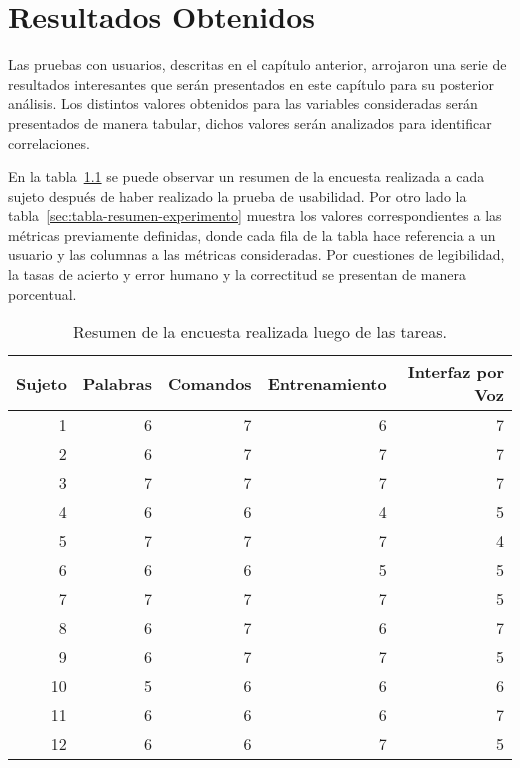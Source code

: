 \chapter{Resultados Obtenidos}
\label{sec:resultados}


Las pruebas con usuarios, descritas en el cap\'itulo anterior, arrojaron una serie de
resultados interesantes que ser\'an presentados en este cap\'itulo para su posterior an\'alisis. Los
distintos valores obtenidos para las variables consideradas ser\'an presentados de manera tabular, dichos
valores ser\'an analizados para identificar correlaciones.

En la tabla~\ref{sec:tabla-encuesta}
se puede observar un resumen de la encuesta realizada a cada sujeto despu\'es de haber realizado la prueba de
usabilidad. 
Por otro lado la tabla~\ref{sec:tabla-resumen-experimento} muestra los valores correspondientes
a las métricas previamente definidas, donde cada fila de la tabla hace referencia a un usuario y 
las columnas a las m\'etricas consideradas. Por cuestiones de legibilidad, la tasas de acierto 
y error humano y la correctitud se presentan de manera porcentual.

\begin{table}[H]
\centering
\footnotesize
\begin{tabular}{|r|r|r|r|r|}
\hline
    Sujeto & Palabras & Comandos & Entrenamiento & Interfaz por Voz \\
\hline
    1 & 6 & 7 & 6 & 7 \\
    2 & 6 & 7 & 7 & 7 \\
    3 & 7 & 7 & 7 & 7 \\
    4 & 6 & 6 & 4 & 5 \\
    5 & 7 & 7 & 7 & 4 \\
    6 & 6 & 6 & 5 & 5 \\
    7 & 7 & 7 & 7 & 5 \\
    8 & 6 & 7 & 6 & 7  \\
    9 & 6 & 7 & 7 & 5  \\
    10 & 5 & 6 & 6 & 6  \\
    11 & 6 & 6 & 6 & 7  \\
    12 & 6 & 6 & 7 & 5  \\
\hline
\end{tabular}
\caption{Resumen de la encuesta realizada luego de las tareas.}
\label{sec:tabla-encuesta}
\end{table}

